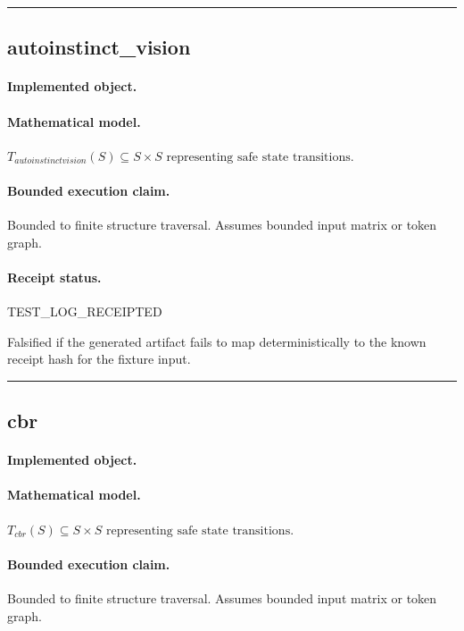 \vspace{1em}\hrule\vspace{1em}
\subsection{autoinstinct\_vision}
\paragraph{Implemented object.} 
\paragraph{Mathematical model.} $T_{autoinstinctvision}(S) \subseteq S \times S \text{ representing safe state transitions}.$
\paragraph{Bounded execution claim.} Bounded to finite structure traversal. Assumes bounded input matrix or token graph.
\paragraph{Receipt status.} TEST\_LOG\_RECEIPTED
\begin{falsifier}
Falsified if the generated artifact fails to map deterministically to the known receipt hash for the fixture input.
\end{falsifier}

\vspace{1em}\hrule\vspace{1em}
\subsection{cbr}
\paragraph{Implemented object.} 
\paragraph{Mathematical model.} $T_{cbr}(S) \subseteq S \times S \text{ representing safe state transitions}.$
\paragraph{Bounded execution claim.} Bounded to finite structure traversal. Assumes bounded input matrix or token graph.
